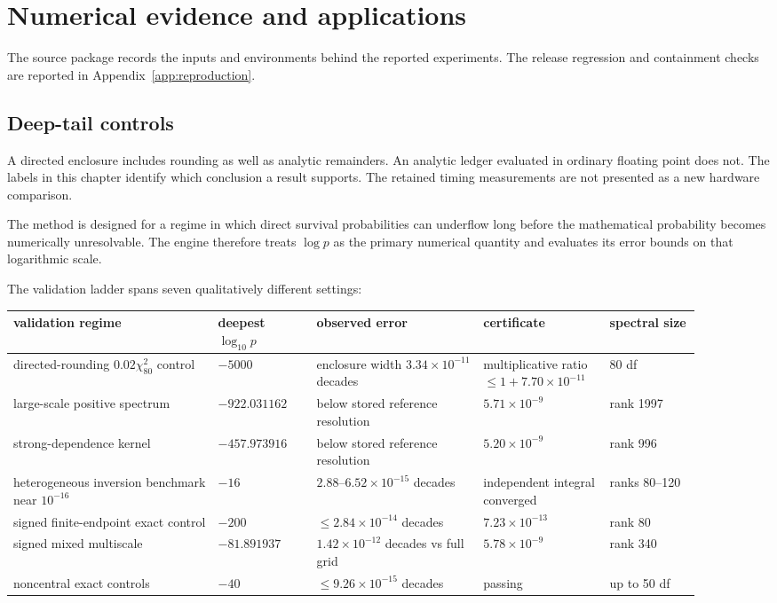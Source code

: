 \chapter{Numerical evidence and applications}\label{ch:evidence}
The source package records the inputs and environments behind the reported
experiments. The release regression and containment checks are reported in
Appendix~\ref{app:reproduction}.

\section{Deep-tail controls}\label{sec:final-3}
A directed enclosure includes rounding as well as analytic remainders. An analytic ledger evaluated in ordinary floating point does not. The labels in this chapter identify which conclusion a result supports. The retained timing measurements are not presented as a new hardware comparison.

The method is designed for a regime in which direct survival probabilities can
underflow long before the mathematical probability becomes numerically
unresolvable.  The engine therefore treats \(\log p\) as the primary numerical
quantity and evaluates its error bounds on that logarithmic scale.

The validation ladder spans seven qualitatively different settings:

\begin{center}
\small
\begin{tabular}{@{}P{0.27\linewidth}P{0.13\linewidth}P{0.22\linewidth}P{0.16\linewidth}P{0.12\linewidth}@{}}
\toprule
validation regime & deepest $\log_{10}p$ & observed error & certificate & spectral size\\
\midrule
directed-rounding $0.02\chi^2_{80}$ control
& $-5000$ & enclosure width $3.34\times10^{-11}$ decades
& multiplicative ratio $\le 1+7.70\times10^{-11}$ & 80 df\\
large-scale positive spectrum
& $-922.031162$ & below stored reference resolution & $5.71\times10^{-9}$ & rank 1997\\
strong-dependence kernel
& $-457.973916$ & below stored reference resolution & $5.20\times10^{-9}$ & rank 996\\
heterogeneous inversion benchmark near $10^{-16}$
& $-16$ & $2.88$--$6.52\times10^{-15}$ decades & independent integral converged & ranks 80--120\\
signed finite-endpoint exact control
& $-200$ & $\le 2.84\times10^{-14}$ decades & $7.23\times10^{-13}$ & rank 80\\
signed mixed multiscale
& $-81.891937$ & $1.42\times10^{-12}$ decades vs full grid & $5.78\times10^{-9}$ & rank 340\\
noncentral exact controls
& $-40$ & $\le 9.26\times10^{-15}$ decades & passing & up to 50 df\\
\bottomrule
\end{tabular}
\end{center}

